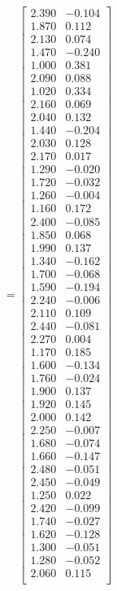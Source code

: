 \begin{example}
\begin{equation}
[x_{\rm measured} ~~~ y_{\rm measured}] = \left[
\begin{array}{rr}
2.390 & -0.104 \\
1.870 & 0.112 \\
2.130 & 0.074 \\
1.470 & -0.240 \\
1.000 & 0.381 \\
2.090 & 0.088 \\
1.020 & 0.334 \\
2.160 & 0.069 \\
2.040 & 0.132 \\
1.440 & -0.204 \\
2.030 & 0.128 \\
2.170 & 0.017 \\
1.290 & -0.020 \\
1.720 & -0.032 \\
1.260 & -0.004 \\
1.160 & 0.172 \\
2.400 & -0.085 \\
1.850 & 0.068 \\
1.990 & 0.137 \\
1.340 & -0.162 \\
1.700 & -0.068 \\
1.590 & -0.194 \\
2.240 & -0.006 \\
2.110 & 0.109 \\
2.440 & -0.081 \\
2.270 & 0.004 \\
1.170 & 0.185 \\
1.600 & -0.134 \\
1.760 & -0.024 \\
1.900 & 0.137 \\
1.920 & 0.145 \\
2.000 & 0.142 \\
2.250 & -0.007 \\
1.680 & -0.074 \\
1.660 & -0.147 \\
2.480 & -0.051 \\
2.450 & -0.049 \\
1.250 & 0.022 \\
2.420 & -0.099 \\
1.740 & -0.027 \\
1.620 & -0.128 \\
1.300 & -0.051 \\
1.280 & -0.052 \\
2.060 & 0.115 \\
\end{array}
\right]
\end{equation}
\end{example}

